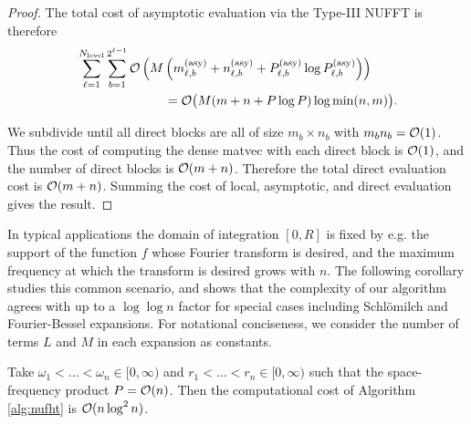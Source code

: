 \begin{proof}

    The total cost of asymptotic evaluation via the Type-III NUFFT is therefore
    \begin{align}
        & \sum_{\ell=1}^{N_{\text{level}}} \sum_{b=1}^{2^{\ell-1}} \bO\left(M\left(m_{\ell,b}^{(\text{asy})} + n_{\ell,b}^{(\text{asy})} + P_{\ell,b}^{(\text{asy})} \log P_{\ell,b}^{(\text{asy})} \right)\right) \\
        &\hspace*{0.2\textwidth} = \bO\big(M (m + n + P\log P) \log \min(n,m) \big).
    \end{align}

    We subdivide until all direct blocks are all of size $m_b \times n_b$ with
    $m_bn_b = \mathcal{O}(1)$. Thus the cost of computing the dense matvec with each
    direct block is $\mathcal{O}(1)$, and the number of direct blocks is $\mathcal{O}(m + n)$.
    Therefore the total direct evaluation cost is $\mathcal{O}(m + n)$. Summing the cost
    of local, asymptotic, and direct evaluation gives the result.
\end{proof}

In typical applications the domain of integration $[0,R]$ is fixed by e.g. the
support of the function $f$ whose Fourier transform is desired, and the maximum
frequency at which the transform is desired grows with $n$. The following
corollary studies this common scenario, and shows that the complexity of our
algorithm agrees with \cite{townsend2015fast} up to a $\log\log n$ factor for
special cases including Schl\"omilch and Fourier-Bessel expansions. For notational conciseness, we consider the number of terms $L$ and $M$ in each expansion as constants.
\begin{corollary}
    Take $\omega_1 < \dots < \omega_n \in [0,\infty)$ and $r_1 < \dots < r_n \in
    [0,\infty)$ such that the space-frequency product $P = \mathcal{O}(n)$. Then the
    computational cost of Algorithm \ref{alg:nufht} is $\mathcal{O}(n\log^2n)$.
\end{corollary}

